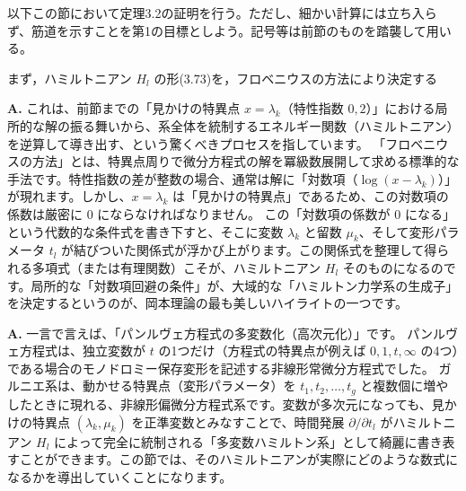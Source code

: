 
\begin{story}

以下この節において定理3.2の証明を行う。ただし、細かい計算には立ち入らず、筋道を示すことを第1の目標としよう。記号等は前節のものを踏襲して用いる。

まず，ハミルトニアン $H_l$ の形(3.73)を，フロベニウスの方法により決定する
\end{story}

\begin{Q}
\textbf{A.} これは、前節までの「見かけの特異点 $x=\lambda_k$（特性指数 $0, 2$）」における局所的な解の振る舞いから、系全体を統制するエネルギー関数（ハミルトニアン）を逆算して導き出す、という驚くべきプロセスを指しています。
「フロベニウスの方法」とは、特異点周りで微分方程式の解を冪級数展開して求める標準的な手法です。特性指数の差が整数の場合、通常は解に「対数項（$\log(x-\lambda_k)$）」が現れます。しかし、$x=\lambda_k$ は「見かけの特異点」であるため、この対数項の係数は厳密に $0$ にならなければなりません。
この「対数項の係数が $0$ になる」という代数的な条件式を書き下すと、そこに変数 $\lambda_k$ と留数 $\mu_k$、そして変形パラメータ $t_l$ が結びついた関係式が浮かび上がります。この関係式を整理して得られる多項式（または有理関数）こそが、ハミルトニアン $H_l$ そのものになるのです。局所的な「対数項回避の条件」が、大域的な「ハミルトン力学系の生成子」を決定するというのが、岡本理論の最も美しいハイライトの一つです。
\end{Q}

\begin{Q}
\textbf{A.} 一言で言えば、「パンルヴェ方程式の多変数化（高次元化）」です。
パンルヴェ方程式は、独立変数が $t$ の1つだけ（方程式の特異点が例えば $0, 1, t, \infty$ の4つ）である場合のモノドロミー保存変形を記述する非線形常微分方程式でした。
ガルニエ系は、動かせる特異点（変形パラメータ）を $t_1, t_2, \dots, t_g$ と複数個に増やしたときに現れる、非線形偏微分方程式系です。変数が多次元になっても、見かけの特異点 $(\lambda_k, \mu_k)$ を正準変数とみなすことで、時間発展 $\partial/\partial t_l$ がハミルトニアン $H_l$ によって完全に統制される「多変数ハミルトン系」として綺麗に書き表すことができます。この節では、そのハミルトニアンが実際にどのような数式になるかを導出していくことになります。
\end{Q}

